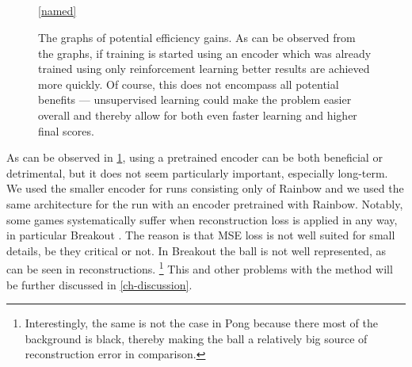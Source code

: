 \begin{figure}[!t]
  \captionsetup[subfloat]{position=top,labelformat=empty}
  \vspace{-1.5cm}
  \centering
    \subfloat[]{  \resizebox{0.4\textwidth}{!}{}}
    \subfloat[]{  \resizebox{0.4\textwidth}{!}{}}\\
  \vspace{-1cm}
    \subfloat[]{  \resizebox{0.4\textwidth}{!}{}}
    \subfloat[]{  \resizebox{0.4\textwidth}{!}{}}\\
  \vspace{-1cm}
    \subfloat[]{  \resizebox{0.4\textwidth}{!}{}}
    \subfloat[]{  \resizebox{0.4\textwidth}{!}{}}\\
  \vspace{-1cm}
    \subfloat[]{  \resizebox{0.4\textwidth}{!}{}}
    \\

    \ref{named}
  \caption{The graphs of potential efficiency gains. As can be observed from the graphs,
  if training is started using an encoder which was already trained using
only reinforcement learning better results are achieved more quickly. Of course, this does not
encompass all potential benefits --- unsupervised learning could make the problem easier overall
and thereby allow for both even faster learning and higher final scores.}
  \label{fig:rl-only-vs-pretrained}
\end{figure}

As can be observed in \ref{fig:rl-only-vs-pretrained}, 
using a pretrained encoder can be both beneficial
or detrimental, but it does not seem particularly important, especially long-term.
We used the smaller encoder for runs consisting only of Rainbow and we used 
the same architecture for the run with an encoder pretrained with Rainbow.
Notably, some games systematically suffer when reconstruction loss is applied in any way,
in particular Breakout . The reason is that MSE loss is not well suited for small 
details, be they critical or not. In Breakout the ball is not well represented,
as can be seen in reconstructions.
\footnote{Interestingly, the same is not the case in Pong because there most of
the background is black, thereby making the ball a relatively big source of 
reconstruction error in comparison.}
This and other problems with the method will be further discussed in 
\ref{ch-discussion}.

